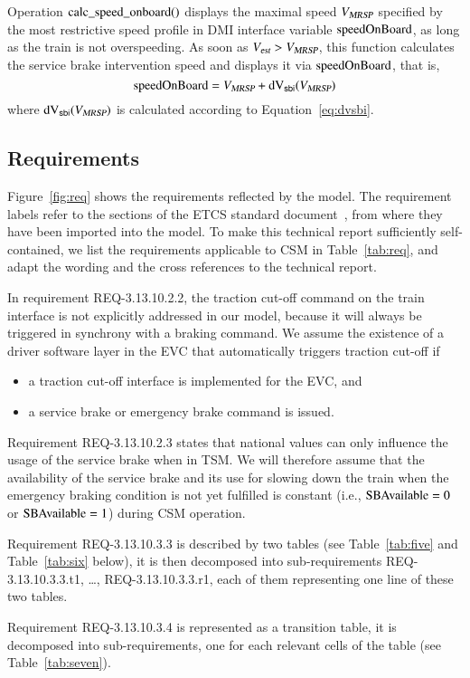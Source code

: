 Operation $\text{calc\_speed\_onboard()}$ displays the maximal speed ${V_{\text{\sl MRSP}}}$ specified by the most restrictive speed profile in DMI interface variable $\text{speedOnBoard}$, as long  as the train is not overspeeding. As soon as ${V_{\text{\sl est}}} > {V_{\text{\sl MRSP}}}$, this function calculates the service brake intervention speed and displays it
via  $\text{speedOnBoard}$, that is,
$$
   \text{speedOnBoard} = {V_{\text{\sl MRSP}}} + \text{dV}_{\mathsf{sbi}}({V_{\text{\sl MRSP}}})
$$
where $\text{dV}_{\mathsf{sbi}}({V_{\text{\sl MRSP}}})$ is calculated according to Equation~\ref{eq:dvsbi}.

\subsection{Requirements}\label{sec:req}
Figure~\ref{fig:req} shows the requirements reflected by the model.
The requirement labels refer to the sections of the ETCS standard document~\cite{ETCSSRS-Principles}, from where they have been imported into the model. To make   this technical report sufficiently self-contained, we list the requirements applicable to CSM in Table~\ref{tab:req}, and adapt the wording and the cross references to the technical report.

 
In requirement REQ-3.13.10.2.2, the traction cut-off command on the train interface is not explicitly addressed in our model, because it will always be triggered in synchrony with a braking command. We assume the existence of a driver software layer in the EVC that automatically 
triggers traction cut-off  if
\begin{itemize}
\item a traction cut-off interface is implemented for the EVC, and
\item a service brake or emergency brake command is issued.
\end{itemize}

Requirement REQ-3.13.10.2.3 states that national values can only influence the usage of the service brake when in TSM. We will therefore assume that the availability of the service brake and its use for slowing down the train when the emergency braking condition is not yet fulfilled is constant (i.e., $\text{SBAvailable} = 0$ or $\text{SBAvailable} = 1$) during CSM operation.

Requirement REQ-3.13.10.3.3 is described by two tables (see Table~\ref{tab:five} and Table~\ref{tab:six} below), it is then 
decomposed into sub-requirements 
REQ-3.13.10.3.3.t1, \ldots, REQ-3.13.10.3.3.r1, each of them representing one line of these two
tables.

Requirement REQ-3.13.10.3.4 is  represented as a transition table, it
is decomposed into sub-requirements, one for each relevant cells of the
table (see Table~\ref{tab:seven}).  

